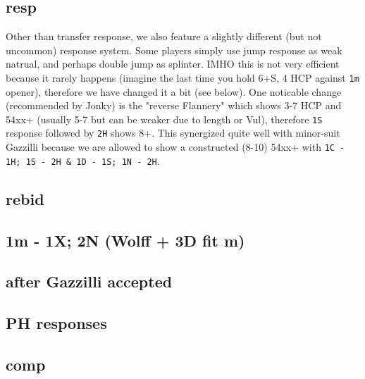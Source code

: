 \subsection{resp}

Other than transfer response, we also feature a slightly different (but not uncommon) response system. 
Some players simply use jump response as weak natrual, and perhaps double jump as splinter. 
IMHO this is not very efficient because it rarely happens (imagine the last time you hold 6+S, 4 HCP against \texttt{1m} opener), 
therefore we have changed it a bit (see below). 
One noticable change (recommended by Jonky) is the "reverse Flannery" which shows 3-7 HCP and 54xx+ (usually 5-7 but can be weaker due to length or Vul), therefore \texttt{1S} response followed by \texttt{2H} shows 8+.
This synergized quite well with minor-suit Gazzilli because we are allowed to show a constructed (8-10) 54xx+ with \texttt{1C - 1H; 1S - 2H \& 1D - 1S; 1N - 2H}. 


\subsection{rebid}


\subsection{1m - 1X; 2N (Wolff + 3D fit m)}


\subsection{after Gazzilli accepted}


\subsection{PH responses}


\subsection{comp}


